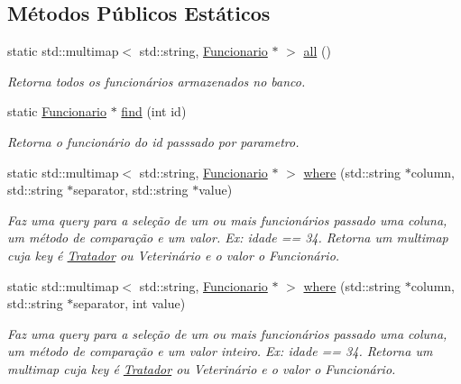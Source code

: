\subsection*{Métodos Públicos Estáticos}
\begin{DoxyCompactItemize}
\item 
static std\+::multimap$<$ std\+::string, \hyperlink{classFuncionario}{Funcionario} $\ast$ $>$ \hyperlink{classFuncionario_abf4016b1493566cd89da6c65c035ef9f}{all} ()
\begin{DoxyCompactList}\small\item\em Retorna todos os funcionários armazenados no banco. \end{DoxyCompactList}\item 
static \hyperlink{classFuncionario}{Funcionario} $\ast$ \hyperlink{classFuncionario_ad08fef8edac1497d827d39e081f1e7bb}{find} (int id)
\begin{DoxyCompactList}\small\item\em Retorna o funcionário do id passsado por parametro. \end{DoxyCompactList}\item 
static std\+::multimap$<$ std\+::string, \hyperlink{classFuncionario}{Funcionario} $\ast$ $>$ \hyperlink{classFuncionario_ae77b29774b71f1c1e336bcb649765488}{where} (std\+::string $\ast$column, std\+::string $\ast$separator, std\+::string $\ast$value)
\begin{DoxyCompactList}\small\item\em Faz uma query para a seleção de um ou mais funcionários passado uma coluna, um método de comparação e um valor. Ex\+: idade == 34. Retorna um multimap cuja key é \hyperlink{classTratador}{Tratador} ou Veterinário e o valor o Funcionário. \end{DoxyCompactList}\item 
static std\+::multimap$<$ std\+::string, \hyperlink{classFuncionario}{Funcionario} $\ast$ $>$ \hyperlink{classFuncionario_a3969bd1819507ef29896e371a94d7c01}{where} (std\+::string $\ast$column, std\+::string $\ast$separator, int value)
\begin{DoxyCompactList}\small\item\em Faz uma query para a seleção de um ou mais funcionários passado uma coluna, um método de comparação e um valor inteiro. Ex\+: idade == 34. Retorna um multimap cuja key é \hyperlink{classTratador}{Tratador} ou Veterinário e o valor o Funcionário. \end{DoxyCompactList}\end{DoxyCompactItemize}
